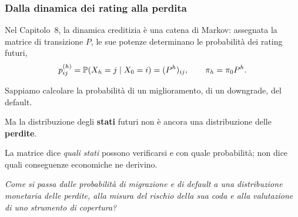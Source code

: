 \begin{frame}%
%

\frametitle{Dalla dinamica dei rating alla perdita}%
%

%


Nel Capitolo~8, la dinamica creditizia \`{e} una catena di Markov: assegnata
la matrice di transizione $P$, le sue potenze determinano le probabilit\`{a}
dei rating futuri,
\[
p_{ij}^{(h)}=\mathbb{P}(X_{h}=j\mid X_{0}=i)=(P^{h})_{ij}, \qquad\pi_{h}=\pi
_{0}P^{h}.
\]


\medskip

\begin{stepitemize}
\item Sappiamo calcolare la probabilit\`{a} di un miglioramento, di un
downgrade, del default.

\item Ma la distribuzione degli \textbf{stati} futuri non \`{e} ancora una
distribuzione delle \textbf{perdite}.

\item La matrice dice \emph{quali stati} possono verificarsi e con quale
probabilit\`{a}; non dice quali conseguenze economiche ne derivino.
\end{stepitemize}

\medskip

\begin{center}
{\small \emph{Come si passa dalle probabilit\`{a} di migrazione e di default a
una distribuzione monetaria delle perdite, alla misura del rischio della sua
coda e alla valutazione di uno strumento di copertura?}}
\end{center}

%

\transboxout
\end{frame}%






